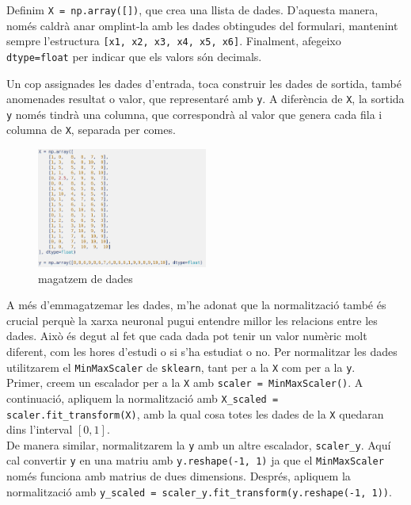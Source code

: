Definim \texttt{X = np.array([])}, que crea una llista de dades.
D’aquesta manera, només caldrà anar omplint-la amb les dades obtingudes del formulari, mantenint sempre l’estructura
\texttt{[x1, x2, x3, x4, x5, x6]}.
Finalment, afegeixo \texttt{dtype=float} per indicar que els valors són decimals.

Un cop assignades les dades d’entrada, toca construir les dades de sortida, també anomenades resultat o valor, que representaré amb \texttt{y}.
A diferència de \texttt{X}, la sortida \texttt{y} només tindrà una columna, que correspondrà al valor que genera cada fila i columna de \texttt{X}, separada per comes.

\begin{figure}[H]
    \centering
    \includegraphics[width=0.5\textwidth]{./figures/23.png}
    \caption{magatzem de dades}
\end{figure}

A més d’emmagatzemar les dades, m’he adonat que la normalització també és crucial perquè la xarxa neuronal pugui entendre millor les relacions entre les dades. Això és degut al fet que cada dada pot tenir un valor numèric molt diferent, com les hores d’estudi o si s’ha estudiat o no. Per normalitzar les dades utilitzarem el \texttt{MinMaxScaler} de \texttt{sklearn}, tant per a la \texttt{X} com per a la \texttt{y}.\\

Primer, creem un escalador per a la \texttt{X} amb \texttt{scaler = MinMaxScaler()}. A continuació, apliquem la normalització amb \texttt{X\_scaled = scaler.fit\_transform(X)}, amb la qual cosa totes les dades de la \texttt{X} quedaran dins l’interval $[0,1]$.\\

De manera similar, normalitzarem la \texttt{y} amb un altre escalador, \texttt{scaler\_y}. Aquí cal convertir \texttt{y} en una matriu amb \texttt{y.reshape(-1, 1)} ja que el \texttt{MinMaxScaler} només funciona amb matrius de dues dimensions. Després, apliquem la normalització amb \texttt{y\_scaled = scaler\_y.fit\_transform(y.reshape(-1, 1))}.


